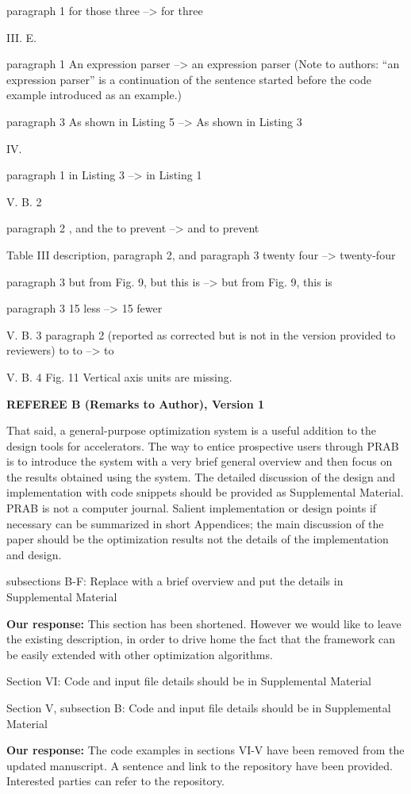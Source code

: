 \documentclass{article}
\begin{document}
paragraph 1
for those three --> for three

III. E.

paragraph 1
An expression parser --> an expression parser
(Note to authors: ``an expression parser'' is a continuation of the
sentence started before the code example introduced as an example.)

paragraph 3
As shown in Listing 5 --> As shown in Listing 3

IV.

paragraph 1
in Listing 3 --> in Listing 1

V. B. 2

paragraph 2
, and the to prevent --> and to prevent

Table III description, paragraph 2, and paragraph 3
twenty four --> twenty-four

paragraph 3
but from Fig. 9, but this is --> but from Fig. 9, this is

paragraph 3
15 less --> 15 fewer

V. B. 3
paragraph 2 (reported as corrected but is not in the version provided
to reviewers)
to to --> to

V. B. 4
Fig. 11 Vertical axis units are missing.




{\bf REFEREE B (Remarks to Author), Version 1}




\vspace{1em}


That said, a general-purpose optimization system is a useful addition
to the design tools for accelerators. The way to entice prospective
users through PRAB is to introduce the system with a very brief
general overview and then focus on the results obtained using the
system. The detailed discussion of the design and implementation with
code snippets should be provided as Supplemental Material. PRAB is not
a computer journal. Salient implementation or design points if
necessary can be summarized in short Appendices; the main discussion
of the paper should be the optimization results not the details of the
implementation and design. 

subsections B-F:
Replace with a brief overview and put the details in Supplemental
Material

{\bf Our response: } {\color{blue} This section has been shortened. However we would like to 
leave the existing description, in order to drive home the fact that the framework can be 
easily extended with other optimization algorithms.}

Section VI: 
Code and input file details should be in Supplemental Material

Section V, subsection B:
Code and input file details should be in Supplemental Material

{\bf Our response:} {\color{blue} The code examples in sections VI-V have been removed from the updated manuscript. 
	A sentence and link to the repository have been provided. Interested parties can refer to the repository.}



 
\end{document}
